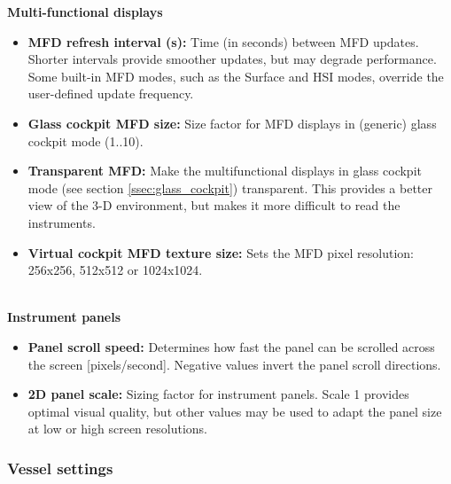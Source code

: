 \documentclass[Orbiter User Manual.tex]{subfiles}
\begin{document}
\textbf{Multi-functional displays}
\begin{itemize}
\item \textbf{MFD refresh interval (s):} Time (in seconds) between MFD updates. Shorter intervals provide smoother updates, but may degrade performance. Some built-in MFD modes, such as the Surface and HSI modes, override the user-defined update frequency.
\item \textbf{Glass cockpit MFD size:} Size factor for MFD displays in (generic) glass cockpit mode (1..10).
\item \textbf{Transparent MFD:} Make the multifunctional displays in glass cockpit mode (see section \ref{ssec:glass_cockpit}) transparent. This provides a better view of the 3-D environment, but makes it more difficult to read the instruments.
\item \textbf{Virtual cockpit MFD texture size:} Sets the MFD pixel resolution: 256x256, 512x512 or 1024x1024.
\end{itemize}
\noindent
\\
\textbf{Instrument panels}
\begin{itemize}
\item \textbf{Panel scroll speed:} Determines how fast the panel can be scrolled across the screen [pixels/second]. Negative values invert the panel scroll directions.
\item \textbf{2D panel scale:} Sizing factor for instrument panels. Scale 1 provides optimal visual quality, but other values may be used to adapt the panel size at low or high screen resolutions.
\end{itemize}

\subsubsection{Vessel settings}
\begin{figure}[H]
	\centering
\end{figure}
\end{document}
